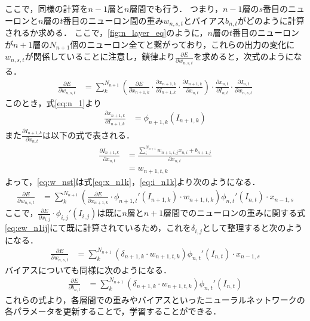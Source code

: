     ここで，同様の計算を$n-1$層と$n$層間でも行う．
    つまり，$n-1$層の$s$番目のニューロンと$n$層の$t$番目のニューロン間の重み$w_{n, s, t}$とバイアス$b_{n, t}$がどのように計算されるか求める．
    ここで，\ref{fig:n_layer_eq}のように，$n$層の$t$番目のニューロンが$n+1$層の$N_{n+1}$個のニューロン全てと繋がっており，これらの出力の変化に$w_{n, s, t}$が関係していることに注意し，鎖律より$ \frac{\partial E}{\partial w_{n, s, t}} $を求めると，次式のようになる．
    \begin{align}
      \frac{\partial E}{\partial w_{n, s, t}} &= \sum_{k}^{N_{n+1}}\left( \frac{\partial E}{\partial x_{n+1, k}}\cdot 
      \frac{\partial x_{n+1, k}}{\partial I_{n+1, k}}\cdot \frac{\partial I_{n+1, k}}{\partial x_{n, t}} \right)
      \cdot \frac{\partial x_{n, t}}{\partial I_{n, t}} \cdot \frac{\partial I_{n, t}}{\partial w_{n, s, t}}
      \label{eq:w_nst}
    \end{align}
    このとき，式\ref{eq:n_1}より
    \begin{align}
      \frac{\partial x_{n+1, k}}{\partial I_{n+1, k}} &= \phi _{n+1, k}(I_{n+1, k})
      \label{eq:x_n1k}
    \end{align}
    また$\frac{\partial I_{n+1, k}}{\partial x_{n, t}} $は以下の式で表される．
    \begin{align}
      \frac{\partial I_{n+1, k}}{\partial x_{n, t}} &= \frac{\sum_{i}^{N_{n+1}}w_{n+1, i, j}x_{n, i} + b_{n+1, j}}{\partial x_{n, t}} \nonumber \\
      &= w_{n+1, t, k}
      \label{eq:i_n1k}
    \end{align}
    よって，\ref{eq:w_nst}は式\ref{eq:x_n1k}，\ref{eq:i_n1k}より次のようになる．
    \begin{align}
      \frac{\partial E}{\partial w_{n, s, t}} &= \sum_{k}^{N_{n+1}} \left( \frac{\partial E}{\partial x_{n+1, k}} \cdot \phi_{n+1, l}'(I_{n+1, k})\cdot w_{n+1, t, k} \right) \phi_{n, t}'(I_{n, t}) \cdot x_{n-1, s} 
    \end{align}
    ここで，$\frac{\partial E}{\partial x_{i, j}}\cdot \phi_{i, j}'(I_{i,j})$は既に$n$層と$n+1$層間でのニューロンの重みに関する式\ref{eq:ew_n1ij}にて既に計算されているため，これを$\delta_{i, j}$として整理すると次のようになる．
    \begin{align}
      \frac{\partial E}{\partial w_{n, s, t}} &= \sum_{k}^{N_{n+1}} \left( \delta_{n+1, k}\cdot w_{n+1, t, k} \right) \phi_{n, t}'(I_{n, t}) \cdot x_{n-1, s} \label{eq:ew_nst}
    \end{align}
    バイアスについても同様に次のようになる．
    \begin{align}
      \frac{\partial E}{\partial b_{n, t}} &= \sum_{k}^{N_{n+1}} \left( \delta_{n+1, k}\cdot w_{n+1, t, k} \right) \phi_{n, t}'(I_{n, t}) 
      \label{eq:eb_nt}
    \end{align}
    これらの式より，各層間での重みやバイアスといったニューラルネットワークの各パラメータを更新することで，学習することができる．
    

